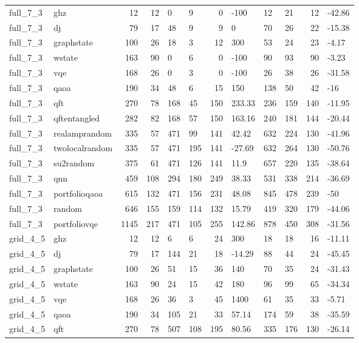 \begin{longtable}{llrrllrlllrl}
full\_7\_3 & ghz & 12 & 12 & 0 & 9 & 0 & -100 & 12 & 21 & 12 & -42.86 \\
full\_7\_3 & dj & 79 & 17 & 48 & 9 & 9 & 0 & 70 & 26 & 22 & -15.38 \\
full\_7\_3 & graphstate & 100 & 26 & 18 & 3 & 12 & 300 & 53 & 24 & 23 & -4.17 \\
full\_7\_3 & wstate & 163 & 90 & 0 & 6 & 0 & -100 & 90 & 93 & 90 & -3.23 \\
full\_7\_3 & vqe & 168 & 26 & 0 & 3 & 0 & -100 & 26 & 38 & 26 & -31.58 \\
full\_7\_3 & qaoa & 190 & 34 & 48 & 6 & 15 & 150 & 138 & 50 & 42 & -16 \\
full\_7\_3 & qft & 270 & 78 & 168 & 45 & 150 & 233.33 & 236 & 159 & 140 & -11.95 \\
full\_7\_3 & qftentangled & 282 & 82 & 168 & 57 & 150 & 163.16 & 240 & 181 & 144 & -20.44 \\
full\_7\_3 & realamprandom & 335 & 57 & 471 & 99 & 141 & 42.42 & 632 & 224 & 130 & -41.96 \\
full\_7\_3 & twolocalrandom & 335 & 57 & 471 & 195 & 141 & -27.69 & 632 & 264 & 130 & -50.76 \\
full\_7\_3 & su2random & 375 & 61 & 471 & 126 & 141 & 11.9 & 657 & 220 & 135 & -38.64 \\
full\_7\_3 & qnn & 459 & 108 & 294 & 180 & 249 & 38.33 & 531 & 338 & 214 & -36.69 \\
full\_7\_3 & portfolioqaoa & 615 & 132 & 471 & 156 & 231 & 48.08 & 845 & 478 & 239 & -50 \\
full\_7\_3 & random & 646 & 155 & 159 & 114 & 132 & 15.79 & 419 & 320 & 179 & -44.06 \\
full\_7\_3 & portfoliovqe & 1145 & 217 & 471 & 105 & 255 & 142.86 & 878 & 450 & 308 & -31.56 \\
grid\_4\_5 & ghz & 12 & 12 & 6 & 6 & 24 & 300 & 18 & 18 & 16 & -11.11 \\
grid\_4\_5 & dj & 79 & 17 & 144 & 21 & 18 & -14.29 & 88 & 44 & 24 & -45.45 \\
grid\_4\_5 & graphstate & 100 & 26 & 51 & 15 & 36 & 140 & 70 & 35 & 24 & -31.43 \\
grid\_4\_5 & wstate & 163 & 90 & 24 & 15 & 42 & 180 & 96 & 99 & 65 & -34.34 \\
grid\_4\_5 & vqe & 168 & 26 & 36 & 3 & 45 & 1400 & 61 & 35 & 33 & -5.71 \\
grid\_4\_5 & qaoa & 190 & 34 & 105 & 21 & 33 & 57.14 & 174 & 59 & 38 & -35.59 \\
grid\_4\_5 & qft & 270 & 78 & 507 & 108 & 195 & 80.56 & 335 & 176 & 130 & -26.14 \\

\end{longtable}
